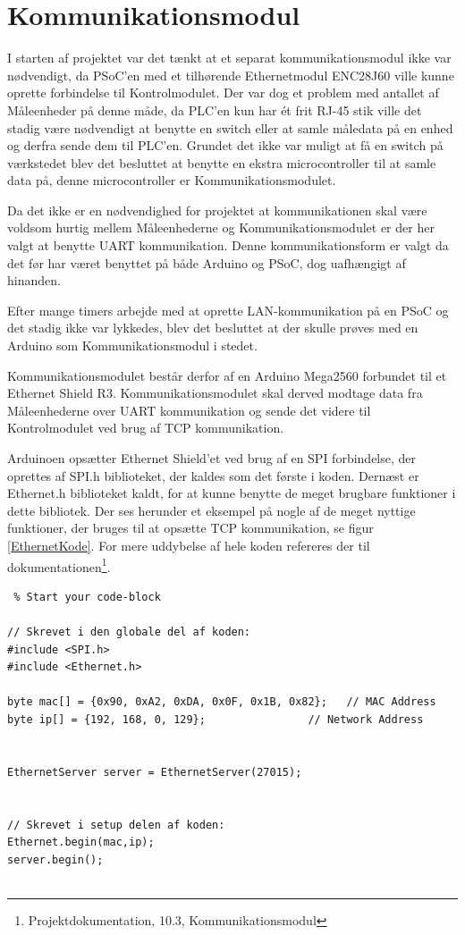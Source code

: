 
\section{Kommunikationsmodul}
\label{Kommunikationsmodul}

I starten af projektet var det tænkt at et separat kommunikationsmodul ikke var nødvendigt, da PSoC'en med et tilhørende Ethernetmodul ENC28J60 ville kunne oprette forbindelse til Kontrolmodulet. Der var dog et problem med antallet af Måleenheder på denne måde, da PLC'en kun har ét frit RJ-45 stik ville det stadig være nødvendigt at benytte en switch eller at samle måledata på en enhed og derfra sende dem til PLC'en. Grundet det ikke var muligt at få en switch på værkstedet blev det besluttet at benytte en ekstra microcontroller til at samle data på, denne microcontroller er Kommunikationsmodulet.   

Da det ikke er en nødvendighed for projektet at kommunikationen skal være voldsom hurtig mellem Måleenhederne og Kommunikationsmodulet er der her valgt at benytte UART kommunikation. Denne kommunikationsform er valgt da det før har været benyttet på både Arduino og PSoC, dog uafhængigt af hinanden.

Efter mange timers arbejde med at oprette LAN-kommunikation på en PSoC og det stadig ikke var lykkedes, blev det besluttet at der skulle prøves med en Arduino som Kommunikationsmodul i stedet. 

Kommunikationsmodulet består derfor af en Arduino Mega2560 forbundet til et Ethernet Shield R3. Kommunikationsmodulet skal derved modtage data fra Måleenhederne over UART kommunikation og sende det videre til Kontrolmodulet ved brug af TCP kommunikation. 

Arduinoen opsætter Ethernet Shield'et ved brug af en SPI forbindelse, der oprettes af SPI.h biblioteket, der kaldes som det første i koden. Dernæst er Ethernet.h biblioteket kaldt, for at kunne benytte de meget brugbare funktioner i dette bibliotek\cite{Ethernet}. Der ses herunder et eksempel på nogle af de meget nyttige funktioner, der bruges til at opsætte TCP kommunikation, se figur \ref{EthernetKode}. For mere uddybelse af hele koden refereres der til dokumentationen\footnote{Projektdokumentation, 10.3, Kommunikationsmodul}.

\begin{lstlisting} % Start your code-block

// Skrevet i den globale del af koden:
#include <SPI.h>
#include <Ethernet.h>

byte mac[] = {0x90, 0xA2, 0xDA, 0x0F, 0x1B, 0x82};   // MAC Address
byte ip[] = {192, 168, 0, 129};                // Network Address


EthernetServer server = EthernetServer(27015);


// Skrevet i setup delen af koden:
Ethernet.begin(mac,ip);
server.begin();


\end{lstlisting}



